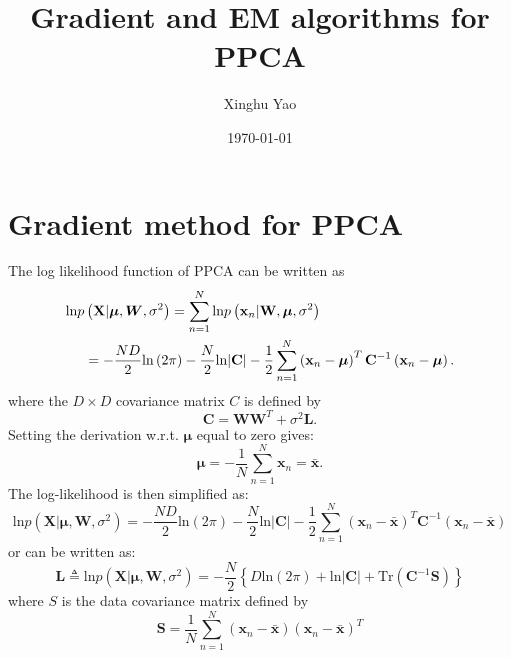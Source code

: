 \documentclass{article}
\title{Gradient and EM algorithms for PPCA}
\author{Xinghu Yao}
\date{\today}
\begin{document}
	\maketitle
	\section{Gradient method for PPCA}
    The log likelihood function of PPCA can be written as 
    \begin{align}
    \text{ln}p&\left(\mathbf{X}|\boldsymbol{\mu},\boldsymbol{W},\sigma^2\right) = \sum\limits_{n=1}^{N}\text{ln}p\left(\mathbf{x}_n|\mathbf{W},\boldsymbol{\mu},\sigma^2\right)\notag\\
    &=-\frac{ND}{2}\text{ln}\left(2\pi\right)-\frac{N}{2}\text{ln}|\mathbf{C}|-\frac{1}{2}\sum\limits_{n=1}^{N}\left(\mathbf{x}_n-\boldsymbol{\mu}\right)^T\mathbf{C}^{-1}\left(\mathbf{x}_n-\boldsymbol{\mu}\right).   
    \end{align}
    where the $D \times D$ covariance matrix $C$ is defined by
    \begin{equation}
    \mathbf{C} = \mathbf{WW}^T+\sigma^2\mathbf{L}.
    \end{equation}
    Setting the derivation w.r.t. $\boldsymbol{\mu}$ equal to zero gives:
    \begin{equation}
    \boldsymbol{\mu} = -\frac{1}{N}\sum\limits_{n=1}^{N}\mathbf{x}_n=\bar{\mathbf{x}}.
    \end{equation}
    The log-likelihood is then simplified as:
    \begin{equation}
    \text{ln}p\left(\mathbf{X}|\boldsymbol{\mu},\textbf{W},\sigma^2\right)= -\frac{ND}{2}\text{ln}\left(2\pi\right)-\frac{N}{2}\text{ln}|\textbf{C}|-\frac{1}{2}\sum\limits^{N}_{n=1}\left(\mathbf{x}_n-\bar{\mathbf{x}}\right)^T\mathbf{C}^{-1}\left(\mathbf{x}_n-\bar{\mathbf{x}}\right)
    \end{equation}
    or can be written as:
    \begin{equation}
	\mathbf{L} \triangleq \text{ln}p\left(\mathbf{X}|\boldsymbol{\mu},\textbf{W},\sigma^2\right)= -\frac{N}{2}\left\{D\text{ln}\left(2\pi\right)+\text{ln}|\textbf{C}|+\text{Tr}\left(\mathbf{C}^{-1}\mathbf{S}\right)\right\}
	\end{equation}
	where $S$ is the data covariance matrix defined by
	\begin{equation}
	\mathbf{S} = \frac{1}{N}\sum\limits_{n=1}^{N}\left(\mathbf{x}_n-\bar{\mathbf{x}}\right)\left(\mathbf{x}_n-\bar{\mathbf{x}}\right)^T
	\end{equation}
\end{document}

